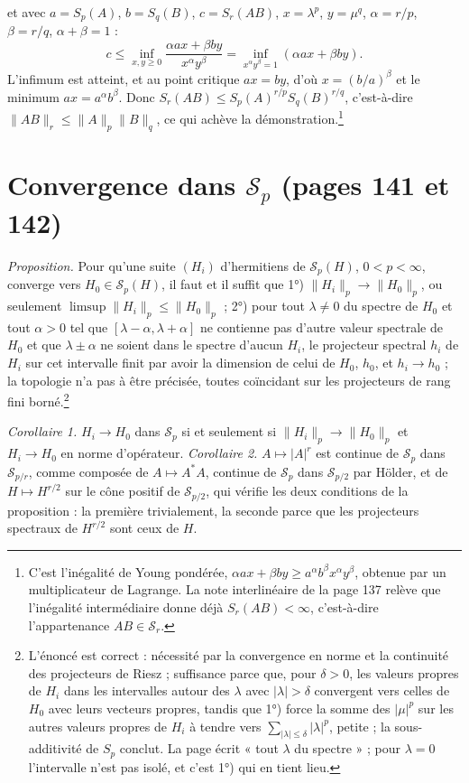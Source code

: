 \documentclass[11pt,a4paper]{article}
\begin{document}
et avec $a = S_p(A)$, $b = S_q(B)$, $c = S_r(AB)$, $x = \lambda^p$, $y =
\mu^q$, $\alpha = r/p$, $\beta = r/q$, $\alpha + \beta = 1$ :
\[
  c \leq \inf_{x, y \geq 0} \frac{\alpha a x + \beta b y}{x^\alpha y^\beta}
  = \inf_{x^\alpha y^\beta = 1} (\alpha a x + \beta b y) .
\]
L'infimum est atteint, et au point critique $ax = by$, d'où $x = (b/a)^\beta$
et le minimum $ax = a^\alpha b^\beta$. Donc $S_r(AB) \leq S_p(A)^{r/p}
S_q(B)^{r/q}$, c'est-à-dire $\|AB\|_r \leq \|A\|_p\|B\|_q$, ce qui achève la
démonstration.\footnote{C'est l'inégalité de Young pondérée, $\alpha a x +
\beta b y \geq a^\alpha b^\beta x^\alpha y^\beta$, obtenue par un multiplicateur
de Lagrange. La note interlinéaire de la page 137 relève que l'inégalité
intermédiaire donne déjà $S_r(AB) < \infty$, c'est-à-dire l'appartenance
$AB \in \mathcal{S}_r$.}

\section*{Convergence dans $\mathcal{S}_p$ (pages 141 et 142)}

\emph{Proposition.} Pour qu'une suite $(H_i)$ d'hermitiens de
$\mathcal{S}_p(H)$, $0 < p < \infty$, converge vers $H_0 \in \mathcal{S}_p(H)$,
il faut et il suffit que
1°) $\|H_i\|_p \to \|H_0\|_p$, ou seulement $\limsup \|H_i\|_p \leq
\|H_0\|_p$ ;
2°) pour tout $\lambda \neq 0$ du spectre de $H_0$ et tout $\alpha > 0$ tel
que $[\lambda - \alpha, \lambda + \alpha]$ ne contienne pas d'autre valeur
spectrale de $H_0$ et que $\lambda \pm \alpha$ ne soient dans le spectre
d'aucun $H_i$, le projecteur spectral $h_i$ de $H_i$ sur cet intervalle
finit par avoir la dimension de celui de $H_0$, $h_0$, et $h_i \to h_0$ ;
la topologie n'a pas à être précisée, toutes coïncidant sur les projecteurs
de rang fini borné.\footnote{L'énoncé est correct : nécessité par la
convergence en norme et la continuité des projecteurs de Riesz ;
suffisance parce que, pour $\delta > 0$, les valeurs propres de $H_i$ dans
les intervalles autour des $\lambda$ avec $|\lambda| > \delta$ convergent
vers celles de $H_0$ avec leurs vecteurs propres, tandis que 1°) force la
somme des $|\mu|^p$ sur les autres valeurs propres de $H_i$ à tendre vers
$\sum_{|\lambda| \leq \delta} |\lambda|^p$, petite ; la sous-additivité de
$S_p$ conclut. La page écrit « tout $\lambda$ du spectre » ; pour $\lambda =
0$ l'intervalle n'est pas isolé, et c'est 1°) qui en tient lieu.}

\emph{Corollaire 1.} $H_i \to H_0$ dans $\mathcal{S}_p$ si et seulement si
$\|H_i\|_p \to \|H_0\|_p$ et $H_i \to H_0$ en norme d'opérateur.
\emph{Corollaire 2.} $A \mapsto |A|^r$ est continue de $\mathcal{S}_p$ dans
$\mathcal{S}_{p/r}$, comme composée de $A \mapsto A^{*}A$, continue de
$\mathcal{S}_p$ dans $\mathcal{S}_{p/2}$ par Hölder, et de $H \mapsto H^{r/2}$
sur le cône positif de $\mathcal{S}_{p/2}$, qui vérifie les deux conditions
de la proposition : la première trivialement, la seconde parce que les
projecteurs spectraux de $H^{r/2}$ sont ceux de $H$.
\end{document}
